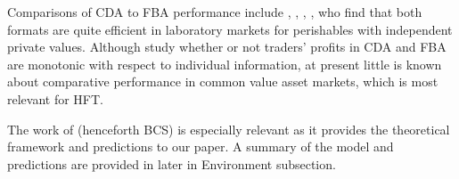 Comparisons of CDA to FBA performance include \cite{Cason1996}, \cite{Cason1997}, \cite{Cason1999}, \cite{Cason2008}, who find that both formats are quite efficient in laboratory markets for perishables with independent private values. Although \cite{Huber2008} study whether or not traders' profits in CDA and FBA are monotonic with respect to individual information, at present little is known about comparative performance in common value asset markets, which is most relevant for HFT.

The work of \cite{Budish2015} (henceforth BCS) is especially relevant as it provides the theoretical framework and predictions to our paper. A summary of the model and predictions are provided in later in Environment subsection.

